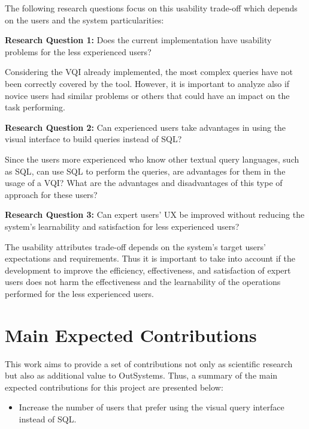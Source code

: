 The following research questions focus on this usability trade-off which depends on the users and the system particularities:

\medskip

\textbf{Research Question 1:} Does the current implementation have usability problems for the less experienced users?

\medskip

Considering the \gls{VQI} already implemented, the most complex queries have not been correctly covered by the tool. However, it is important to analyze also if novice users had similar problems or others that could have an impact on the task performing.

\medskip

\textbf{Research Question 2:} Can experienced users take advantages in using the visual interface to build queries instead of \gls{SQL}?

\medskip

Since the users more experienced who know other textual query languages, such as \gls{SQL}, can use \gls{SQL} to perform the queries, are advantages for them in the usage of a \gls{VQI}? What are the advantages and disadvantages of this type of approach for these users?

\medskip

\textbf{Research Question 3:} Can expert users' \gls{UX} be improved without reducing the system's learnability and satisfaction for less experienced users?


\medskip

The usability attributes trade-off depends on the system's target users' expectations and requirements. Thus it is important to take into account if the development to improve the efficiency, effectiveness, and satisfaction of expert users does not harm the effectiveness and the learnability of the operations performed for the less experienced users.

\section{Main Expected Contributions}
\label{sec:main_exp_contributions}
This work aims to provide a set of contributions not only as scientific research but also as additional value to OutSystems. Thus, a summary of the main expected contributions for this project are presented below:

\begin{itemize}
  \item Increase the number of users that prefer using the visual query interface instead of SQL.
\end{itemize} 

